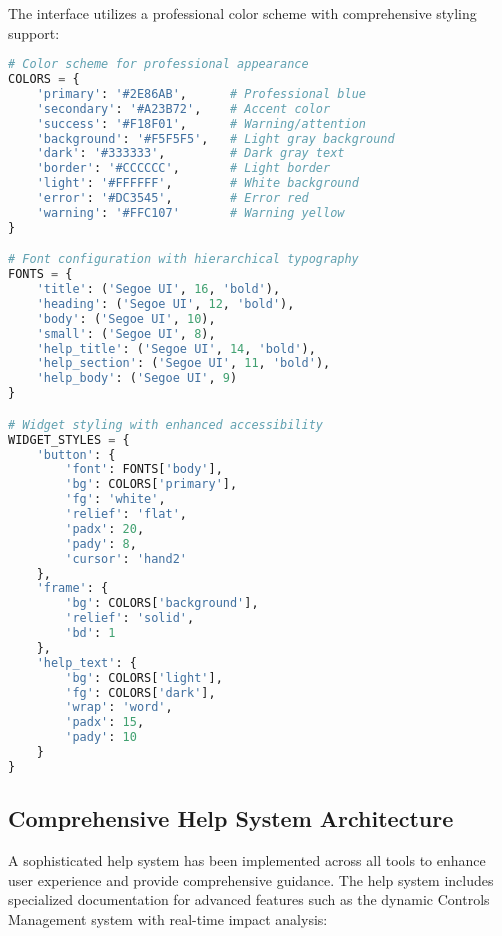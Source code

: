 \documentclass[binding=0.6cm]{sapthesis}
\begin{document}
The interface utilizes a professional color scheme with comprehensive styling support:

\begin{lstlisting}[language=Python, caption=Enhanced UI Styling Configuration]
# Color scheme for professional appearance
COLORS = {
    'primary': '#2E86AB',      # Professional blue
    'secondary': '#A23B72',    # Accent color
    'success': '#F18F01',      # Warning/attention
    'background': '#F5F5F5',   # Light gray background
    'dark': '#333333',         # Dark gray text
    'border': '#CCCCCC',       # Light border
    'light': '#FFFFFF',        # White background
    'error': '#DC3545',        # Error red
    'warning': '#FFC107'       # Warning yellow
}

# Font configuration with hierarchical typography
FONTS = {
    'title': ('Segoe UI', 16, 'bold'),
    'heading': ('Segoe UI', 12, 'bold'),
    'body': ('Segoe UI', 10),
    'small': ('Segoe UI', 8),
    'help_title': ('Segoe UI', 14, 'bold'),
    'help_section': ('Segoe UI', 11, 'bold'),
    'help_body': ('Segoe UI', 9)
}

# Widget styling with enhanced accessibility
WIDGET_STYLES = {
    'button': {
        'font': FONTS['body'],
        'bg': COLORS['primary'],
        'fg': 'white',
        'relief': 'flat',
        'padx': 20,
        'pady': 8,
        'cursor': 'hand2'
    },
    'frame': {
        'bg': COLORS['background'],
        'relief': 'solid',
        'bd': 1
    },
    'help_text': {
        'bg': COLORS['light'],
        'fg': COLORS['dark'],
        'wrap': 'word',
        'padx': 15,
        'pady': 10
    }
}
\end{lstlisting}

\subsection{Comprehensive Help System Architecture}

A sophisticated help system has been implemented across all tools to enhance user experience and provide comprehensive guidance. The help system includes specialized documentation for advanced features such as the dynamic Controls Management system with real-time impact analysis:
\end{document}
